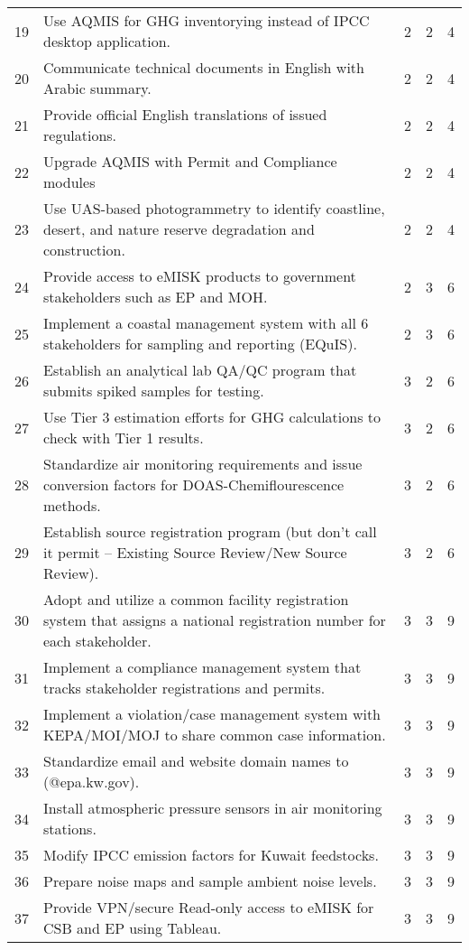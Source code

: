 \begin{table}[H]
{\begin{tabular}{@{}clccc@{}}
19 & Use AQMIS for GHG inventorying instead of IPCC desktop application. & 2 & 2 & 4 \\
20 & Communicate technical documents in English with Arabic summary. & 2 & 2 & 4 \\
21 & Provide official English translations of issued regulations. & 2 & 2 & 4 \\
22 & Upgrade AQMIS with Permit and Compliance modules & 2 & 2 & 4 \\
23 & Use UAS-based photogrammetry to identify coastline, desert, and nature reserve degradation and construction. & 2 & 2 & 4 \\
24 & Provide access to eMISK products to government stakeholders such as EP and MOH. & 2 & 3 & 6 \\
25 & Implement a coastal management system with all 6 stakeholders for sampling and reporting (EQuIS). & 2 & 3 & 6 \\
26 & Establish an analytical lab QA/QC program that submits spiked samples for testing. & 3 & 2 & 6 \\
27 & Use Tier 3 estimation efforts for GHG calculations to check with Tier 1 results. & 3 & 2 & 6 \\
28 & Standardize air monitoring requirements and issue conversion factors for DOAS-Chemiflourescence methods. & 3 & 2 & 6 \\
29 & Establish source registration program (but don’t call it permit – Existing Source Review/New Source Review). & 3 & 2 & 6 \\
30 & Adopt and utilize a common facility registration system that assigns a national registration number for each stakeholder. & 3 & 3 & 9 \\
31 & Implement a compliance management system that tracks stakeholder registrations and permits. & 3 & 3 & 9 \\
32 & Implement a violation/case management system with KEPA/MOI/MOJ to share common case information. & 3 & 3 & 9 \\
33 & Standardize email and website domain names to (@epa.kw.gov). & 3 & 3 & 9 \\
34 & Install atmospheric pressure sensors in air monitoring stations. & 3 & 3 & 9 \\
35 & Modify IPCC emission factors for Kuwait feedstocks. & 3 & 3 & 9 \\
36 & Prepare noise maps and sample ambient noise levels. & 3 & 3 & 9 \\
37 & Provide VPN/secure Read-only access to eMISK for CSB and EP using Tableau. & 3 & 3 & 9 \\ \bottomrule
\end{tabular}
} %
\end{table}